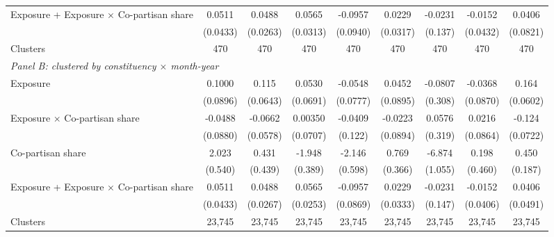 {\begin{tabular}{l*{8}{c}}
Exposure + Exposure $\times$ Co-partisan share&      0.0511         &0.0488\sym{*}         &0.0565\sym{*}         &     -0.0957         &      0.0229         &     -0.0231         &     -0.0152         &      0.0406         \\
            &    (0.0433)         &    (0.0263)         &    (0.0313)         &    (0.0940)         &    (0.0317)         &     (0.137)         &    (0.0432)         &    (0.0821)         \\
Clusters    &         470         &         470         &         470         &         470         &         470         &         470         &         470         &         470         \\
\midrule

\multicolumn{9}{l}{\textit{Panel B: clustered by constituency $\times$ month-year}} \\
Exposure    &      0.1000         &       0.115\sym{*}  &      0.0530         &     -0.0548         &      0.0452         &     -0.0807         &     -0.0368         &       0.164\sym{***}\\
            &    (0.0896)         &    (0.0643)         &    (0.0691)         &    (0.0777)         &    (0.0895)         &     (0.308)         &    (0.0870)         &    (0.0602)         \\
Exposure $\times$ Co-partisan share&     -0.0488         &     -0.0662         &     0.00350         &     -0.0409         &     -0.0223         &      0.0576         &      0.0216         &      -0.124\sym{*}  \\
            &    (0.0880)         &    (0.0578)         &    (0.0707)         &     (0.122)         &    (0.0894)         &     (0.319)         &    (0.0864)         &    (0.0722)         \\
Co-partisan share&       2.023\sym{***}&       0.431         &      -1.948\sym{***}&      -2.146\sym{***}&       0.769\sym{**} &      -6.874\sym{***}&       0.198         &       0.450\sym{**} \\
            &     (0.540)         &     (0.439)         &     (0.389)         &     (0.598)         &     (0.366)         &     (1.055)         &     (0.460)         &     (0.187)         \\

Exposure + Exposure $\times$ Co-partisan share&      0.0511         &0.0488\sym{*}         &0.0565\sym{**}         &     -0.0957         &      0.0229         &     -0.0231         &     -0.0152         &      0.0406         \\
            &    (0.0433)         &    (0.0267)         &    (0.0253)         &    (0.0869)         &    (0.0333)         &     (0.147)         &    (0.0406)         &    (0.0491)         \\
Clusters    &      23,745         &      23,745         &      23,745         &      23,745         &      23,745         &      23,745         &      23,745         &      23,745         \\
\midrule


\end{tabular}}
